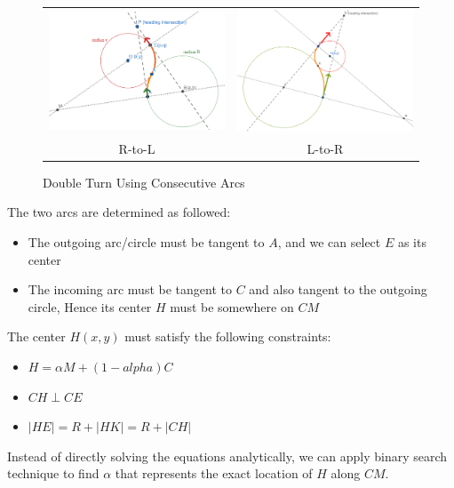 \documentclass{article}
\begin{document}
\begin{figure}[hbt]
  \begin{tabular}{cc}    
    \includegraphics[width=6cm]{screenshots/double-turns-right-left.png} & 
    \includegraphics[width=6cm]{screenshots/double-turns-left-right.png}\\
    R-to-L & L-to-R
  \end{tabular}
  \caption{Double Turn Using Consecutive Arcs}
  \label{fig:double-RL}
\end{figure}

The two arcs are determined as followed:

\begin{itemize}
  \item The outgoing arc/circle must be tangent to $A$, and we can select $E$ as its center
  \item The incoming arc must be tangent to $C$ and also tangent to the outgoing circle,
        Hence its center $H$ must be somewhere on $CM$
\end{itemize}
The center $H(x,y)$ must satisfy the following constraints:

\begin{itemize}
  \item $H = \alpha M + (1-alpha) C$
  \item $CH \perp CE$
  \item $|HE| = R + |HK| = R + |CH|$
\end{itemize}

Instead of directly solving the equations analytically, we can apply binary search technique to find $\alpha$
that represents the exact location of $H$ along $CM$.
\end{document}
